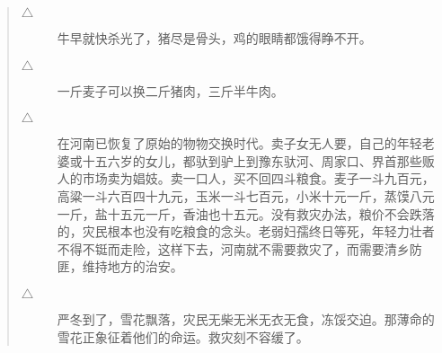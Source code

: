 \begin{quote}
\begin{description}
		\item [$\bigtriangleup$] 牛早就快杀光了，猪尽是骨头，鸡的眼睛都饿得睁不开。\\
		
		\item [$\bigtriangleup$] 一斤麦子可以换二斤猪肉，三斤半牛肉。\\
		
		\item [$\bigtriangleup$] 在河南已恢复了原始的物物交换时代。卖子女无人要，自己的年轻老婆或十五六岁的女儿，都驮到驴上到豫东驮河、周家口、界首那些贩人的市场卖为娼妓。卖一口人，买不回四斗粮食。麦子一斗九百元，高粱一斗六百四十九元，玉米一斗七百元，小米十元一斤，蒸馍八元一斤，盐十五元一斤，香油也十五元。没有救灾办法，粮价不会跌落的，灾民根本也没有吃粮食的念头。老弱妇孺终日等死，年轻力壮者不得不铤而走险，这样下去，河南就不需要救灾了，而需要清乡防匪，维持地方的治安。\\
		
		\item [$\bigtriangleup$] 严冬到了，雪花飘落，灾民无柴无米无衣无食，冻馁交迫。那薄命的雪花正象征着他们的命运。救灾刻不容缓了。\\
	\end{description}
\end{quote}